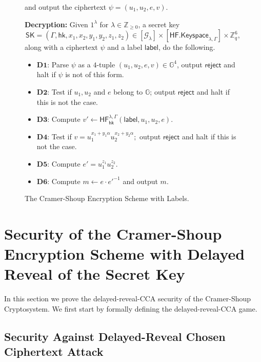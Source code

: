 \documentclass[10pt,a4paper]{article}
\newcommand{\SK}{\mathsf{SK}}
\newcommand{\G}{\mathbb{G}}
\newcommand{\hk}{\mathsf{hk}}
\newcommand{\lab}{\mathsf{label}}
\newcommand{\dstep}[1]{\mathbf{D#1}}
\newcommand{\reject}{\mathsf{reject}}
\begin{document}
\begin{figure}[ht!]
\begin{framed}
			and output the ciphertext $\psi = (u_1, u_2, e, v)$.
			
			\vspace{4mm}
			
			\textbf{Decryption:} Given $1^\lambda$ for $\lambda\in\mathbb{Z}_{\geq 0}$, a secret key $$\SK=(\Gamma, \hk, x_1,x_2,y_1,y_2,z_1,z_2)\in[\mathcal{G}_\lambda]\times[\mathsf{HF.Keyspace}_{\lambda,\Gamma}]\times\mathbb{Z}_q^{6},$$
			along with a ciphertext $\psi$ and a label $\lab$, do the following.\\
			
			\begin{itemize}
				\item[]\textbf{$\dstep{1}$}: Parse $\psi$ as a $4$-tuple $(u_1,u_2,e,v)\in\G^4$, output $\reject$ and halt if $\psi$ is not of this form.
				\item[]\textbf{$\dstep{2}$}: Test if $u_1, u_2$ and $e$ belong to $\G$; output $\reject$ and halt if this is not the case.
				\item[]\textbf{$\dstep{3}$}: Compute $v'\gets\mathsf{HF}^{\lambda,\Gamma}_{\hk}(\lab,u_1,u_2,e)$.
				\item[]\textbf{$\dstep{4}$}: Test if $v = u_1^{x_1+y_1\alpha}u_2^{x_2+y_2\alpha};$ output $\reject$ and halt if this is not the case.
				\item[]\textbf{$\dstep{5}$}: Compute $e' = u_1^{z_1}u_2^{z_2}$.
				\item[]\textbf{$\dstep{6}$}: Compute $m\gets e\cdot {e'}^{-1}$ and output $m$.
			\end{itemize}
			
			
		\end{framed}
		\caption{The Cramer-Shoup Encryption Scheme with Labels.}
		\label{fig:cs03}
	\end{figure}
	
	

	
	
	
	\newpage
	\appendix
	
	\section{Security of the Cramer-Shoup Encryption Scheme with Delayed Reveal of the Secret Key}
	
	In this section we prove the delayed-reveal-CCA security of the Cramer-Shoup Cryptosystem. We first start by formally defining the delayed-reveal-CCA game.
	
	\subsection{Security Against Delayed-Reveal Chosen Ciphertext Attack}
	
\end{document}
